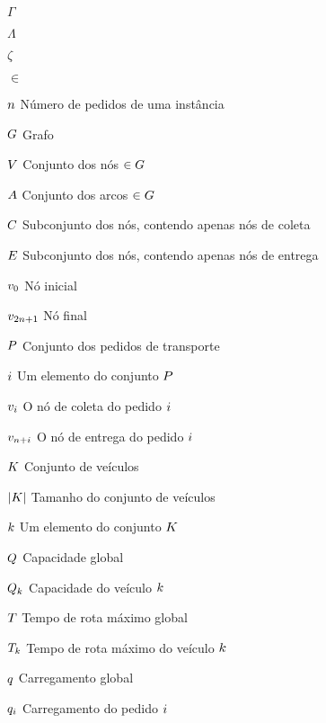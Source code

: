 


\begin{simbolos}
    \item[$ \Gamma $] 
    \item[$ \Lambda $] 
    \item[$ \zeta $] 
    \item[$ \in $] 
    \item[$n$] Número de pedidos de uma instância
    \item[$G$] Grafo
    \item[$V$] Conjunto dos nós $\in G$
    \item[$A$]{Conjunto dos arcos $\in G$}
    \item[$C$] Subconjunto dos nós, contendo apenas nós de coleta
    \item[$E$] Subconjunto dos nós, contendo apenas nós de entrega
    \item[$v_{0}$] Nó inicial
    \item[$v_{2n + 1}$] Nó final 
    \item[$P$] Conjunto dos pedidos de transporte 
    \item[$i$] Um elemento do conjunto $P$
    \item[$v_{i}$] O nó de coleta do pedido $i$
    \item[$v_{n + i}$] O nó de entrega do pedido $i$
    \item[$K$] Conjunto de veículos
    \item[$|K|$] Tamanho do conjunto de veículos
    \item[$k$] Um elemento do conjunto $K$
    \item[$Q$] Capacidade global
    \item[$Q_{k}$] Capacidade do veículo $k$
    \item[$T$] Tempo de rota máximo global
    \item[$T_k$] Tempo de rota máximo do veículo $k$
    \item[$q$] Carregamento global
    \item[$q_i$] Carregamento do pedido $i$

\end{simbolos}
